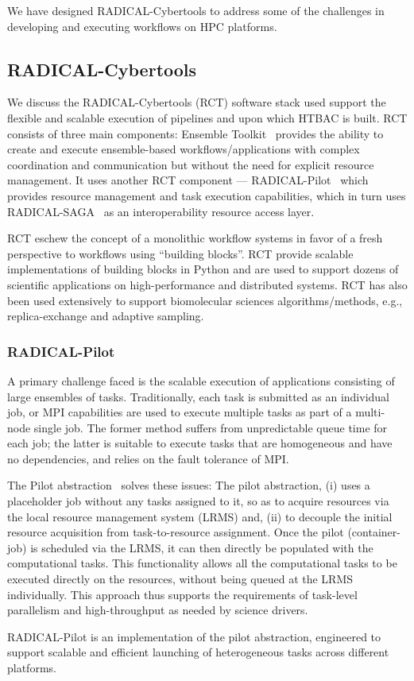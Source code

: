 
We have designed RADICAL-Cybertools to address some of the challenges in
developing and executing workflows on HPC platforms. 


\subsection{RADICAL-Cybertools}

We discuss the RADICAL-Cybertools (RCT) software stack used support the
flexible and scalable execution of pipelines and upon which HTBAC is built.
RCT consists of three main components: Ensemble Toolkit~\cite{entk-icpp-2016}
provides the ability to create and execute ensemble-based
workflows/applications with complex coordination and communication but without
the need for explicit resource management. It uses another RCT component ---
RADICAL-Pilot~\cite{review_radicalpilot} which provides resource management
and task execution capabilities, which in turn uses RADICAL-SAGA~\cite{saga-x
,ogf- gfd-90} as an interoperability resource access layer.

RCT eschew the concept of a monolithic workflow systems in favor of a fresh
perspective to workflows using ``building blocks''. RCT provide scalable
implementations of building blocks in Python and are used to support dozens of
scientific applications on high-performance and distributed systems. RCT has
also been used extensively to support biomolecular sciences
algorithms/methods, e.g., replica-exchange and adaptive sampling.

\subsubsection*{RADICAL-Pilot}\label{sec:pilot}

A primary challenge faced is the scalable execution of applications consisting
of large ensembles of tasks.  Traditionally, each task is submitted as an
individual job, or MPI capabilities are used to  execute multiple tasks as
part of a multi-node single job. The former method suffers from unpredictable
queue time for each job; the latter is suitable to execute tasks that are
homogeneous and have no dependencies, and relies on the fault tolerance of
MPI.

The Pilot abstraction~\cite{review_pilotreview} solves these issues:  The
pilot abstraction, (i) uses a placeholder job without any tasks assigned to
it, so as to acquire resources via the local resource management system (LRMS)
and, (ii) to decouple the initial resource acquisition from task-to-resource
assignment. Once the pilot (container-job) is scheduled via the LRMS, it can
then directly be populated with the computational tasks. This functionality
allows all the computational tasks to be executed directly on the resources,
without being queued at the LRMS individually. This approach thus supports the
requirements of task-level parallelism and high-throughput as needed by
science drivers.

RADICAL-Pilot is an implementation of the pilot abstraction, engineered to
support scalable and efficient launching of heterogeneous tasks across
different platforms.
